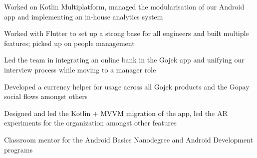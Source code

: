 \documentclass[]{deedy-resume-reversed}
\begin{document}
\begin{minipage}[t]{0.60\textwidth}

\textbullet{}
\begin{tightemize}
\item Worked on Kotlin Multiplatform, managed the modularisation of our Android app and implementing an in-house analytics system
\end{tightemize}

\textbullet{}
\begin{tightemize}
\item Worked with Flutter to set up a strong base for all engineers and built multiple features; picked up on people management
\end{tightemize}

\textbullet{}
\begin{tightemize}
\item Led the team in integrating an online bank in the Gojek app and unifying our interview process while moving to a manager role
\end{tightemize}

\textbullet{}
\begin{tightemize}
\item Developed a currency helper for usage across all Gojek products and the Gopay social flows amongst others
\end{tightemize}
\sectionsep


\textbullet{}
\begin{tightemize}
\item Designed and led the Kotlin + MVVM migration of the app, led the AR experiments for the organization amongst other features
\end{tightemize}
\sectionsep


\textbullet{}
\begin{tightemize}
\item Classroom mentor for the Android Basics Nanodegree and Android Development programs
\end{tightemize}
\sectionsep


\end{minipage}
\end{document}
